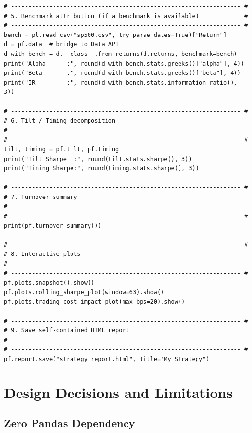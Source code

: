 \documentclass[11pt,a4paper]{article}
\begin{document}
\begin{lstlisting}[caption={Complete usage example.}]
# ------------------------------------------------------------------ #
# 5. Benchmark attribution (if a benchmark is available)             #
# ------------------------------------------------------------------ #
bench = pl.read_csv("sp500.csv", try_parse_dates=True)["Return"]
d = pf.data  # bridge to Data API
d_with_bench = d.__class__.from_returns(d.returns, benchmark=bench)
print("Alpha      :", round(d_with_bench.stats.greeks()["alpha"], 4))
print("Beta       :", round(d_with_bench.stats.greeks()["beta"], 4))
print("IR         :", round(d_with_bench.stats.information_ratio(), 3))

# ------------------------------------------------------------------ #
# 6. Tilt / Timing decomposition                                      #
# ------------------------------------------------------------------ #
tilt, timing = pf.tilt, pf.timing
print("Tilt Sharpe  :", round(tilt.stats.sharpe(), 3))
print("Timing Sharpe:", round(timing.stats.sharpe(), 3))

# ------------------------------------------------------------------ #
# 7. Turnover summary                                                 #
# ------------------------------------------------------------------ #
print(pf.turnover_summary())

# ------------------------------------------------------------------ #
# 8. Interactive plots                                                #
# ------------------------------------------------------------------ #
pf.plots.snapshot().show()
pf.plots.rolling_sharpe_plot(window=63).show()
pf.plots.trading_cost_impact_plot(max_bps=20).show()

# ------------------------------------------------------------------ #
# 9. Save self-contained HTML report                                  #
# ------------------------------------------------------------------ #
pf.report.save("strategy_report.html", title="My Strategy")
\end{lstlisting}

\section{Design Decisions and Limitations}
\label{sec:design}

\subsection{Zero Pandas Dependency}
\end{document}
